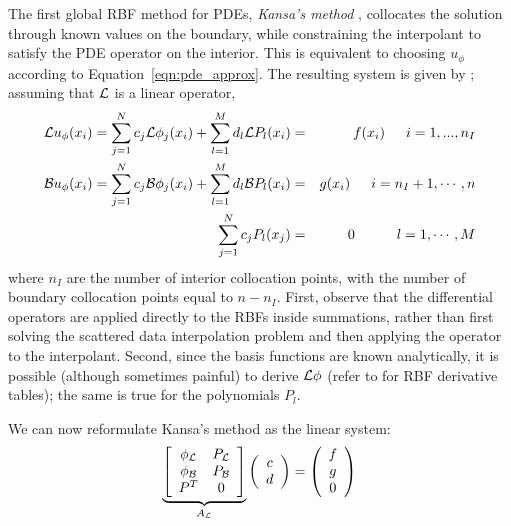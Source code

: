 \documentclass{report}
\begin{document}
{The first global RBF method for PDEs, \emph{Kansa's method} \cite{Kansa1990a, Kansa1990b}, collocates the solution through known values on the boundary, while constraining the interpolant to satisfy the PDE operator on the interior. This is equivalent to choosing $u_\phi$ according to Equation~\ref{eqn:pde_approx}. The resulting system is given by \cite{Mouat2002}; assuming that $\mathcal{L}$ is a linear operator, 
\begin{eqnarray}
\mathcal{L}u_\phi(x_i) = \sum_{j=1}^{N}c_j\mathcal{L}\phi_j(x_i) + \sum_{l=1}^{M}d_l \mathcal{L}P_l(x_i) &=&f(x_i)  \hskip1.5em i = 1,...,n_I  \label{eqn:kansa_interior} \\ 
\mathcal{B}u_\phi(x_i) = \sum_{j=1}^{N}c_j \mathcal{B}\phi_j(x_i) + \sum_{l=1}^{M}d_l \mathcal{B}P_l(x_i) &=& g(x_i)  \hskip1.5em i = n_I + 1, \cdots, n \label{eqn:kansa_boundary} \\
\sum_{j=1}^{N} c_j P_l(x_j) & = & 0 \hskip3.0em l=1,\cdots,M \label{eqn:kansa_constraints} 
\end{eqnarray}
where $n_I$ are the number of interior collocation points, with the number of boundary collocation points equal to $n - n_I$. First, observe that the differential operators are applied directly to the RBFs inside summations, rather than first solving the scattered data interpolation problem and then applying the operator to the interpolant.  Second, since the basis functions are known analytically, it is possible (although sometimes painful) to derive $\mathcal{L}\phi$ (refer to \cite{Fasshauer2007} for RBF derivative tables); the same is true for the polynomials $P_l$. 

We can now reformulate Kansa's method as the linear system: 
\begin{eqnarray}
\underbrace{\left[ \begin{array}{c c} 
	\phi_{\mathcal{L}} & P_{\mathcal{L}} \\
	\phi_{\mathcal{B}} & P_{\mathcal{B}} \\
	P^T & 0
	\end{array} \right]}_{A_{\mathcal{L}}}  \left( \begin{array}{c}
							{c} \\
							{d}
							 \end{array}
						 \right) = \left( \begin{array}{c}
							{f} \\
							{g} \\
							0
							 \end{array}
						 \right) 
	\label{eqn:kansa_method}
\end{eqnarray}


}
\end{document}
